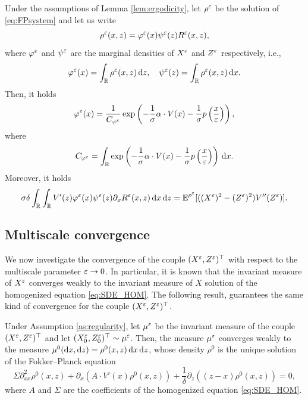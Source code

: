 \documentclass[10pt]{article}
\begin{document}
\begin{lemma}\label{lem:FPMarginal} Under the assumptions of Lemma \ref{lem:ergodicity}, let $\rho^\varepsilon$ be the solution of \eqref{eq:FPsystem} and let us write 
\begin{equation}\label{eq:densityDecomposition}
	\rho^\varepsilon(x, z) = \varphi^\varepsilon(x)\psi^\varepsilon(z)R^\varepsilon(x,z),
\end{equation}
where $\varphi^\varepsilon$ and $\psi^\varepsilon$ are the marginal densities of $X^\varepsilon$ and $Z^\varepsilon$ respectively, i.e., 
\begin{equation}
	\varphi^\varepsilon(x) = \int_{\mathbb{R}} \rho^\varepsilon(x,z) \,\mathrm{d} z, \quad  \psi^\varepsilon(z) = \int_{\mathbb{R}} \rho^\varepsilon(x,z) \,\mathrm{d} x.
\end{equation}
Then, it holds
\begin{equation}\label{eq:marginalX}
	\varphi^\varepsilon(x) = \frac{1}{C_{\varphi^\varepsilon}} \exp\left(-\frac{1}{\sigma} \alpha \cdot V(x) - \frac{1}{\sigma} p \left ( \frac{x}{\varepsilon} \right )\right),
\end{equation}
where
\begin{equation}
	C_{\varphi^\varepsilon} = \int_{\mathbb{R}} \exp\left(-\frac{1}{\sigma} \alpha \cdot V(x) - \frac{1}{\sigma} p \left ( \frac{x}{\varepsilon} \right )\right) \,\mathrm{d} x.
\end{equation}
Moreover, it holds
\begin{equation}
	\sigma \delta \int_{\mathbb{R}} \int_{\mathbb{R}} V'(z) \varphi^\varepsilon(x) \psi^\varepsilon(z) \partial_x R^\varepsilon(x,z) \,\mathrm{d} x \,\mathrm{d} z = \operatorname{\mathbb{E}}^{\rho^\varepsilon}[((X^\varepsilon)^2 - (Z^\varepsilon)^2)V''(Z^\varepsilon)].
\end{equation}
\end{lemma}

\subsection{Multiscale convergence}\label{sec:convMS}

We now investigate the convergence of the couple $(X^\varepsilon, Z^\varepsilon)^\top$ with respect to the multiscale parameter $\varepsilon \to 0$. In particular, it is known that the invariant measure of $X^\varepsilon$ converges weakly to the invariant measure of $X$ solution of the homogenized equation \eqref{eq:SDE_HOM}. The following result,  guarantees the same kind of convergence for the couple $(X^\varepsilon, Z^\varepsilon)^\top$.

\begin{lemma}\label{lem:convMeasure} Under Assumption \ref{as:regularity}, let $\mu^\varepsilon$ be the invariant measure of the couple $(X^\varepsilon, Z^\varepsilon)^\top$ and let $(X_0^\varepsilon, Z_0^\varepsilon)^\top \sim \mu^\varepsilon$. Then, the measure $\mu^\varepsilon$ converges weakly to the measure $\mu^0(\mathrm{d} x, \mathrm{d} z) = \rho^0(x, z) \,\mathrm{d} x \,\mathrm{d} z$, whose density $\rho^0$ is the unique solution of the Fokker--Planck equation
\begin{equation} \label{eq:FPsystem_homogenized}
	\Sigma \partial^2_{xx} \rho^0(x,z) + \partial_x\left( A \cdot V'(x) \rho^0(x,z) \right) + \frac{1}{\delta}\partial_z\left((z - x) \rho^0(x,z) \right) = 0,
\end{equation}
where $A$ and $\Sigma$ are the coefficients of the homogenized equation \eqref{eq:SDE_HOM}.
\end{lemma}
\end{document}
